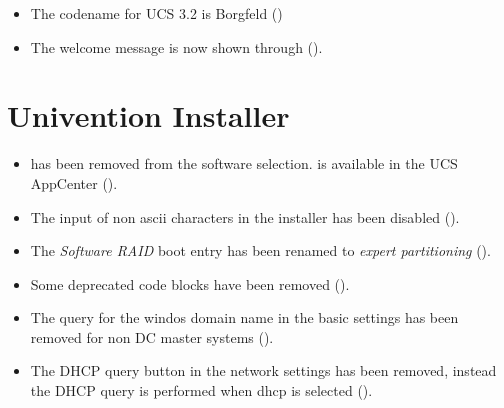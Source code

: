 \newcommand{\ucsUCRV}[1]{Univention Configuration Registry variable \ucsCommand{\ucsBCindex{#1}}}
\newcommand{\ucsCVE}[1]{\href{http://security-tracker.debian.org/tracker/CVE-#1}{CVE-#1}}

\begin{itemize}
\item The codename for UCS 3.2 is Borgfeld ()

\item The welcome message is now shown through  ().

\end{itemize}


\section{Univention Installer}
\begin{itemize}

\item {} has been removed from the software
selection.  is available in the UCS AppCenter
(). 

\item The input of non ascii characters in the installer has been disabled
().

\item The \emph{Software RAID} boot entry has been renamed to \emph{expert
partitioning} ().

\item Some deprecated code blocks have been removed ().

\item The query for the windos domain name in the basic settings has been
removed for non DC master systems ().

\item The DHCP query button in the network settings has been removed, instead
the DHCP query is performed when dhcp is selected ().

\end{itemize}



